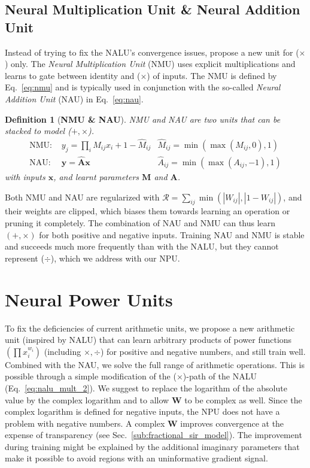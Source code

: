 \documentclass[9pt]{article}
\newtheorem*{definition}{Definition}
\begin{document}
\subsection{Neural Multiplication Unit \& Neural Addition Unit}%
\label{sub:neural_multiplication_unit}

Instead of trying to fix the NALU's convergence issues,
\cite{madsen_neural_2020} propose a new unit for ($\times$) only.
The \emph{Neural Multiplication Unit} (NMU) uses explicit multiplications and learns
to gate between identity and ($\times$) of inputs. The NMU is
defined by Eq.~\ref{eq:nmu} and is typically used in conjunction with the
so-called \emph{Neural Addition Unit} (NAU) in Eq.~\ref{eq:nau}.

\begin{definition}[{\bf NMU \& NAU}]
  NMU and NAU are two units that can be stacked to model ($+,\times$).
  \begin{align}
    \label{eq:nmu}
    \text{NMU: } &y_j = \prod_i \hat M_{ij} x_{i} + 1 - \hat M_{ij}  & \hat M_{ij}=\min(\max(M_{ij}, 0), 1)\\
    \label{eq:nau}
    \text{NAU: } &\bm y = \bm{\hat{A}} \bm x & \hat A_{ij}=\min(\max(A_{ij}, -1), 1)
  \end{align}
  with inputs $\bm x$, and learnt parameters $\bm M$ and $\bm A$.
\end{definition}

Both NMU and NAU are regularized with $\mathcal{R} = \sum_{ij} \min(|W_{ij}|,
|1-W_{ij}|)$, and their weights are clipped, which biases them towards learning
an operation or pruning it completely.  The combination of NAU and NMU can thus
learn $(+,\times)$ for both positive and negative inputs. Training NAU and NMU
is stable and succeeds much more frequently than with the NALU, but they cannot
represent ($\div$), which we address with our NPU.


\section{Neural Power Units}%
\label{sec:neural_power_unit}

To fix the deficiencies of current arithmetic units, we propose a new
arithmetic unit (inspired by NALU) that can learn arbitrary products of power functions $(\prod x_{i}^{w_i})$ (including
$\times,\div$) for positive and negative numbers, and still train well.
Combined with the NAU, we solve the full range of arithmetic operations.
This is possible through a simple modification of the ($\times$)-path of the
NALU (Eq.~\ref{eq:nalu_mult_2}). 
We suggest to replace the logarithm of the absolute value by the complex logarithm and
to allow $\bm W$ to be complex as well. Since the complex logarithm is defined for
negative inputs, the NPU does not have a problem with negative numbers. A complex $\bm W$ 
improves convergence at the expense of transparency (see
Sec.~\ref{sub:fractional_sir_model}). The improvement during training might be
explained by the additional imaginary parameters that make it possible to avoid
regions with an uninformative gradient signal.
\end{document}
